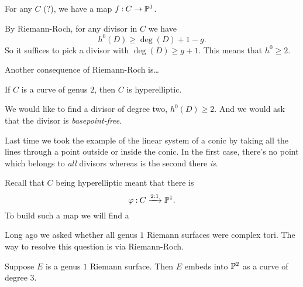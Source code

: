 \documentclass[12pt]{memoir}
\begin{document}
\begin{Prop}
    For any $C$ (?), we have a map $f\mathbin{:} C\to\mathbb{P}^1$.
\end{Prop}

\begin{ptcbp}
    By Riemann-Roch, for any divisor in $C$ we have
    $$h^0(D)\geq \deg(D)+1-g.$$
    So it suffices to pick a divisor with $\deg(D)\geq g+1$. This means that $h^0\geq 2$.
\end{ptcbp}

Another consequence of Riemann-Roch is\dots
\begin{Prop}
    If $C$ is a curve of genus $2$, then $C$ is hyperelliptic.
\end{Prop}

We would like to find a divisor of degree two, $h^0(D)\geq 2$. And we would ask that the divisor is \emph{basepoint-free}.

\begin{Ex}
    Last time we took the example of the linear system of a conic by taking all the lines through a point outside or inside the conic. In the first case, there's no point which belongs to \emph{all} divisors whereas is the second there \emph{is}.
\end{Ex}

\begin{ptcbp}
    Recall that $C$ being hyperelliptic meant that there is 
    $$\varphi\mathbin{:} C\xrightarrow{2:1}\mathbb{P}^1.$$
    To build such a map we will find a 
\end{ptcbp}

Long ago we asked whether all genus $1$ Riemann surfaces were complex tori. The way to resolve this question is via Riemann-Roch.

\begin{Prop}
    Suppose $E$ is a genus $1$ Riemann surface. Then $E$ embeds into $\mathbb{P}^2$ as a curve of degree $3$.
\end{Prop}
\end{document}
